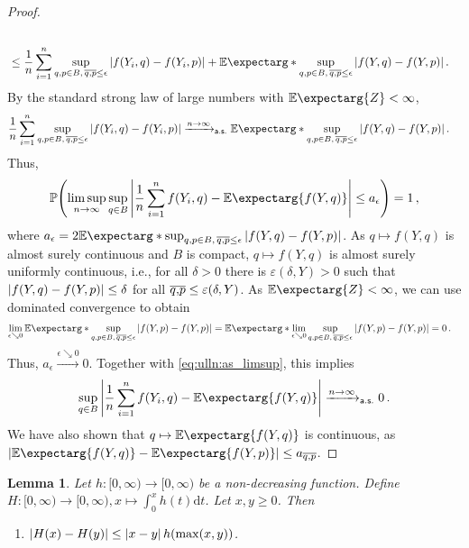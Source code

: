 \documentclass{scrartcl}
\newcommand{\PrOf}[1]{\Pr\mathopen{}\lb #1 \rb\mathclose{}}
\newcommand{\Ex}{\E\expectarg}
\newcommand*{\ms}[1]{\mathsf{#1}}
\newcommand{\dl}{\mathrm{d}}
\newcommand{\equationFullstop}{\, .}
\newcommand{\eqfs}{\equationFullstop}
\newcommand{\equationComma}{\, ,}
\newcommand{\eqcm}{\equationComma}
\newcommand{\sol}[2]{\overline{#1,#2}}
\theoremstyle{plain}\newtheorem{theorem}{Theorem}[section]
\newtheorem{lemma}[theorem]{Lemma}
\theoremstyle{definition}
\theoremstyle{remark}
\begin{document}
\begin{appendix}
\begin{proof}
\begin{align*}
	\\& \leq
	\frac 1n \sum_{i=1}^n \sup_{q,p\in B,\, \sol qp \leq \epsilon} \abs{f(Y_i, q) - f(Y_i, p)} 
	+ 
	\Ex*{\sup_{q,p\in B,\, \sol qp \leq \epsilon} \abs{f(Y, q) - f(Y, p)}} 
	\eqfs
\end{align*}
By the standard strong law of large numbers with $\Ex{Z} < \infty$, 
\begin{align*}
	\frac 1n \sum_{i=1}^n \sup_{q,p\in B,\, \sol qp \leq \epsilon} \abs{f(Y_i, q) - f(Y_i, p)} 
	&\xrightarrow{n \to \infty}_{\ms{a.s.}} 
	\Ex*{\sup_{q,p\in B,\, \sol qp \leq \epsilon} \abs{f(Y, q) - f(Y, p)} }
	\eqfs
\end{align*}
Thus,
\begin{equation}\label{eq:ulln:as_limsup}
	\PrOf{
		\limsup_{n\to\infty} \sup_{q\in B} \abs{\frac 1n \sum_{i=1}^n f(Y_i, q) - \Ex{f(Y, q)}}
		\leq
		a_\epsilon
	} = 1
	\eqcm
\end{equation}
where $a_\epsilon = 2 \Ex*{\sup_{q,p\in B,\, \sol qp \leq \epsilon} \abs{f(Y, q) - f(Y, p)} }$.
As $q \mapsto f(Y, q)$ is almost surely continuous and $B$ is compact, $q \mapsto f(Y, q)$ is almost surely uniformly continuous, i.e., for all $\delta > 0$ there is $\varepsilon(\delta, Y) > 0$ such that $\left| f(Y,q)-f(Y,p) \right| \leq \delta$ for all $\overline{q,\!p} \leq \varepsilon(\delta, Y)$.
As $\Ex{Z} < \infty$, we can use dominated convergence to obtain 
\begin{align*}
	\lim_{\epsilon\searrow0} 	\Ex*{\sup_{q,p\in B,\, \sol qp \leq \epsilon} \abs{f(Y, p) - f(Y, p)} }
	&=
	\Ex*{\lim_{\epsilon\searrow0}\sup_{q,p\in B,\, \sol qp \leq \epsilon} \abs{f(Y, p) - f(Y, p)} }
	=
	0
	\eqfs
\end{align*}
Thus, $a_\epsilon \xrightarrow{\epsilon\searrow0} 0$. Together with \eqref{eq:ulln:as_limsup}, this implies
\begin{equation*}
 \sup_{q\in B} \abs{\frac 1n \sum_{i=1}^n f(Y_i, q) - \Ex{f(Y, q)}} \xrightarrow{n \to \infty}_{\ms{a.s.}} 0
 \eqfs
\end{equation*}
We have also shown that $q\mapsto \Ex{f(Y, q)}$ is continuous, as $\abs{\Ex{f(Y, q)}-\Ex{f(Y, p)}} \leq a_{\sol qp}$.
\end{proof}
 \begin{lemma}\label{lmm:nondec}
Let $h \colon [0,\infty) \to [0,\infty)$ be a non-decreasing function.
Define $H \colon [0,\infty) \to [0,\infty), x\mapsto \int_0^x h(t) \dl t$.
Let $x, y \geq 0$. Then
\begin{enumerate}[label=(\roman*)]
\item $\left| H(x) - H(y) \right| \leq \left| x-y \right|h(\max(x, y))$.

\end{enumerate}
\end{lemma}
\end{appendix}
\end{document}

